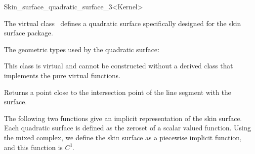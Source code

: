 
\ccRefPageBegin



\begin{ccRefClass}{Skin_surface_quadratic_surface_3<Kernel>}
\label{refSkinsurfacequadraticsurface}
\ccDefinition
  
The virtual class \ccRefName\ defines a quadratic surface specifically
designed for the skin surface package.


\ccTypes
The geometric types used by the quadratic surface:
\ccThreeToTwo

\ccGlue
{}
\ccGlue
{}
\ccGlue
{}
\ccGlue
{}

\ccCreation
{}  %

This class is virtual and cannot be constructed without a derived
class that implements the pure virtual functions.


\ccOperations
{}
\ccThreeToTwo

{Returns a point close to the intersection point of the line segment
   with the surface.}
%
\ccGlue 
%

The following two functions give an implicit representation of the
skin surface. Each quadratic surface is defined as the zeroset of a
scalar valued function. Using the mixed complex, we define the skin
surface as a piecewise implicit function, and this function is $C^1$.


\ccGlue {}

\ccSeeAlso
{}
\end{ccRefClass}

